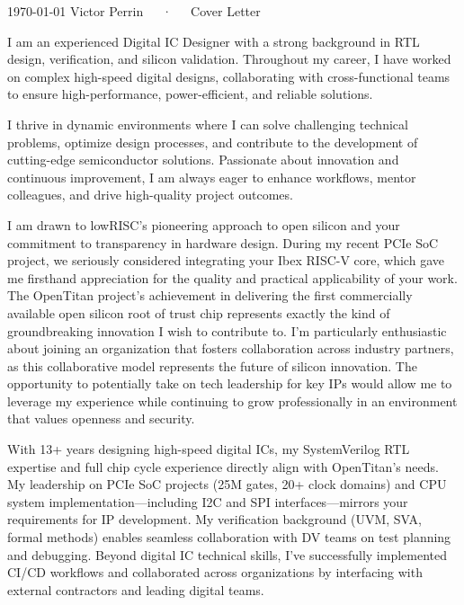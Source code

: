 \documentclass[11pt, a4paper]{awesome-cv}
\begin{document}
\makecvheader[R]

\makecvfooter
  {\today}
  {Victor Perrin~~~·~~~Cover Letter}
  {}

\makelettertitle

\begin{cvletter}

I am an experienced Digital IC Designer with a strong background in RTL design, verification, and silicon validation. Throughout my career, I have worked on complex high-speed digital designs, collaborating with cross-functional teams to ensure high-performance, power-efficient, and reliable solutions.

I thrive in dynamic environments where I can solve challenging technical problems, optimize design processes, and contribute to the development of cutting-edge semiconductor solutions. Passionate about innovation and continuous improvement, I am always eager to enhance workflows, mentor colleagues, and drive high-quality project outcomes.

I am drawn to lowRISC's pioneering approach to open silicon and your commitment to transparency in hardware design. During my recent PCIe SoC project, we seriously considered integrating your Ibex RISC-V core, which gave me firsthand appreciation for the quality and practical applicability of your work. The OpenTitan project's achievement in delivering the first commercially available open silicon root of trust chip represents exactly the kind of groundbreaking innovation I wish to contribute to. I'm particularly enthusiastic about joining an organization that fosters collaboration across industry partners, as this collaborative model represents the future of silicon innovation. The opportunity to potentially take on tech leadership for key IPs would allow me to leverage my experience while continuing to grow professionally in an environment that values openness and security.

With 13+ years designing high-speed digital ICs, my SystemVerilog RTL expertise and full chip cycle experience directly align with OpenTitan's needs. My leadership on PCIe SoC projects (25M gates, 20+ clock domains) and CPU system implementation—including I2C and SPI interfaces—mirrors your requirements for IP development. My verification background (UVM, SVA, formal methods) enables seamless collaboration with DV teams on test planning and debugging. Beyond digital IC technical skills, I've successfully implemented CI/CD workflows and collaborated across organizations by interfacing with external contractors and leading digital teams.

\end{cvletter}


\makeletterclosing
\end{document}
